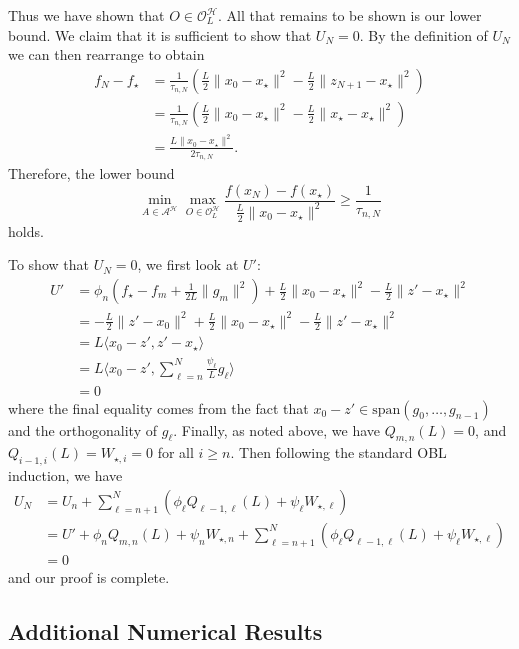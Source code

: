 \documentclass[11pt]{article}
\numberwithin{equation}{section}
\theoremstyle{definition}
\theoremstyle{plain}
\theoremstyle{definition}
\begin{document}
Thus we have shown that $O \in \mathcal{O}_L^\mathcal{H}$. All that remains to be shown is our lower bound. We claim that it is sufficient to show that $U_N = 0$. By the definition of $U_N$ we can then rearrange to obtain
\begin{align*}
    f_N - f_\star & = \frac{1}{\tau_{n,N}} \left(\frac{L}{2}\|x_0 - x_\star\|^2 - \frac{L}{2}\|z_{N+1} - x_\star\|^2 \right) \\
    & = \frac{1}{\tau_{n,N}} \left(\frac{L}{2}\|x_0 - x_\star\|^2 - \frac{L}{2}\|x_\star - x_\star\|^2 \right) \\
    & = \frac{L\|x_0 - x_\star\|^2}{2 \tau_{n,N}}.
\end{align*}
Therefore, the lower bound 
\begin{equation}
    \min_{A\in \mathcal{A}^\mathcal{H}} \max_{O \in\mathcal{O}_L^\mathcal{H}} \frac{f(x_N)-f(x_\star)}{\frac{L}{2}\|x_0-x_\star\|^2} \geq \frac{1}{\tau_{n,N}}
\end{equation}
holds.

To show that $U_N = 0$, we first look at $U'$:
\begin{align*}
    U' &= \phi_n\left(f_\star - f_m + \frac{1}{2L}\|g_m\|^2\right) + \frac{L}{2}\|x_0-x_\star\|^2 - \frac{L}{2}\|z' - x_\star\|^2 \\
    & = -\frac{L}{2}\|z'-x_0\|^2 + \frac{L}{2}\|x_0-x_\star\|^2 - \frac{L}{2}\|z' - x_\star\|^2 \\
    &= L \langle x_0-z', z' - x_\star \rangle \\
    &= L \langle x_0-z', \sum_{\ell = n}^N \frac{\psi_\ell}{L} g_\ell \rangle \\
    & = 0
\end{align*}
where the final equality comes from the fact that $x_0 - z' \in \text{span}(g_0, \dots, g_{n-1})$ and the orthogonality of $g_\ell$.
Finally, as noted above, we have $Q_{m,n}(L) = 0$, and $Q_{i-1,i}(L) = W_{\star,i} = 0$ for all $i \geq n$. Then following the standard OBL induction, we have
\begin{align*}
    U_N &= U_n + \sum_{\ell=n+1}^N \left(\phi_\ell Q_{\ell-1,\ell}(L) + \psi_\ell W_{\star,\ell} \right) \\
     & = U' + \phi_n Q_{m,n}(L) + \psi_n W_{\star,n} + \sum_{\ell=n+1}^N \left(\phi_\ell Q_{\ell-1,\ell}(L) + \psi_\ell W_{\star,\ell} \right) \\
     &= 0
\end{align*}
and our proof is complete.

\subsection{Additional Numerical Results} \label{SubSec:AdditionalNumerics}
\end{document}
